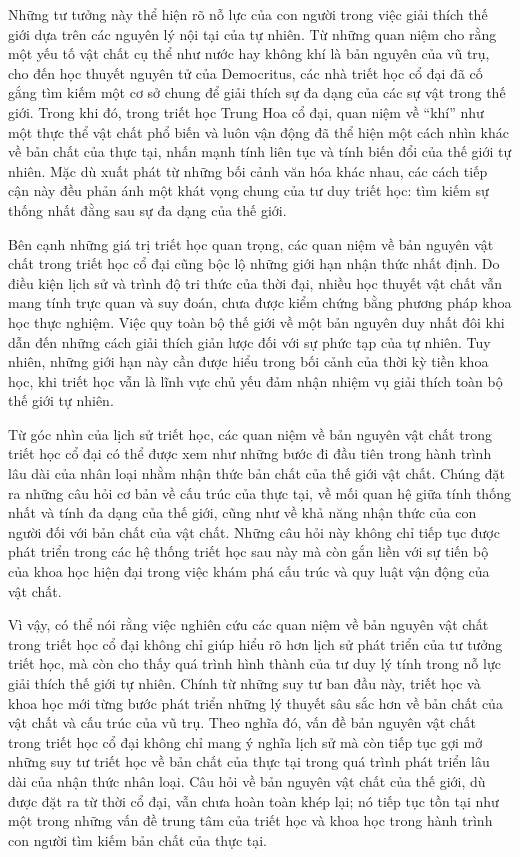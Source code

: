 \documentclass[14pt,a4paper]{extarticle}
\begin{document}
Những tư tưởng này thể hiện rõ nỗ lực của con người trong việc giải thích thế giới dựa trên các nguyên lý nội tại của tự nhiên. Từ những quan niệm cho rằng một yếu tố vật chất cụ thể như nước hay không khí là bản nguyên của vũ trụ, cho đến học thuyết nguyên tử của Democritus, các nhà triết học cổ đại đã cố gắng tìm kiếm một cơ sở chung để giải thích sự đa dạng của các sự vật trong thế giới. Trong khi đó, trong triết học Trung Hoa cổ đại, quan niệm về ``khí'' như một thực thể vật chất phổ biến và luôn vận động đã thể hiện một cách nhìn khác về bản chất của thực tại, nhấn mạnh tính liên tục và tính biến đổi của thế giới tự nhiên. Mặc dù xuất phát từ những bối cảnh văn hóa khác nhau, các cách tiếp cận này đều phản ánh một khát vọng chung của tư duy triết học: tìm kiếm sự thống nhất đằng sau sự đa dạng của thế giới.

Bên cạnh những giá trị triết học quan trọng, các quan niệm về bản nguyên vật chất trong triết học cổ đại cũng bộc lộ những giới hạn nhận thức nhất định. Do điều kiện lịch sử và trình độ tri thức của thời đại, nhiều học thuyết vật chất vẫn mang tính trực quan và suy đoán, chưa được kiểm chứng bằng phương pháp khoa học thực nghiệm. Việc quy toàn bộ thế giới về một bản nguyên duy nhất đôi khi dẫn đến những cách giải thích giản lược đối với sự phức tạp của tự nhiên. Tuy nhiên, những giới hạn này cần được hiểu trong bối cảnh của thời kỳ tiền khoa học, khi triết học vẫn là lĩnh vực chủ yếu đảm nhận nhiệm vụ giải thích toàn bộ thế giới tự nhiên.

Từ góc nhìn của lịch sử triết học, các quan niệm về bản nguyên vật chất trong triết học cổ đại có thể được xem như những bước đi đầu tiên trong hành trình lâu dài của nhân loại nhằm nhận thức bản chất của thế giới vật chất. Chúng đặt ra những câu hỏi cơ bản về cấu trúc của thực tại, về mối quan hệ giữa tính thống nhất và tính đa dạng của thế giới, cũng như về khả năng nhận thức của con người đối với bản chất của vật chất. Những câu hỏi này không chỉ tiếp tục được phát triển trong các hệ thống triết học sau này mà còn gắn liền với sự tiến bộ của khoa học hiện đại trong việc khám phá cấu trúc và quy luật vận động của vật chất.

Vì vậy, có thể nói rằng việc nghiên cứu các quan niệm về bản nguyên vật chất trong triết học cổ đại không chỉ giúp hiểu rõ hơn lịch sử phát triển của tư tưởng triết học, mà còn cho thấy quá trình hình thành của tư duy lý tính trong nỗ lực giải thích thế giới tự nhiên. Chính từ những suy tư ban đầu này, triết học và khoa học mới từng bước phát triển những lý thuyết sâu sắc hơn về bản chất của vật chất và cấu trúc của vũ trụ. Theo nghĩa đó, vấn đề bản nguyên vật chất trong triết học cổ đại không chỉ mang ý nghĩa lịch sử mà còn tiếp tục gợi mở những suy tư triết học về bản chất của thực tại trong quá trình phát triển lâu dài của nhận thức nhân loại. Câu hỏi về bản nguyên vật chất của thế giới, dù được đặt ra từ thời cổ đại, vẫn chưa hoàn toàn khép lại; nó tiếp tục tồn tại như một trong những vấn đề trung tâm của triết học và khoa học trong hành trình con người tìm kiếm bản chất của thực tại.

\newpage
\nocite{*}
\printbibliography[title={Tài liệu tham khảo}]
\end{document}
